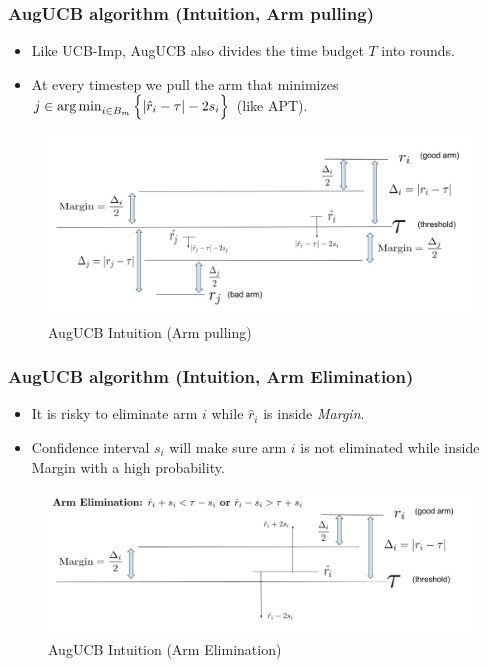 \begin{frame}
\frametitle{AugUCB algorithm (Intuition, Arm pulling)}
\begin{itemize}
\item Like UCB-Imp, AugUCB also divides the time budget $T$ into rounds.
\item At every timestep we pull the arm that minimizes $j\in\operatorname*{arg\,min}_{i\in B_{m}}\Big\lbrace |\hat{r}_{i} - \tau | - 2s_{i}\Big\rbrace$ (like APT). 
\end{itemize}

\begin{figure}
\caption{AugUCB Intuition (Arm pulling)}
\includegraphics[scale=0.178]{img/SeminarThresholdBandit.png}
\end{figure}
\end{frame}

\begin{frame}
\frametitle{AugUCB algorithm (Intuition, Arm Elimination)}
\begin{itemize}
\item It is risky to eliminate arm $i$ while $\hat{r}_i$ is inside \emph{Margin}. 
\item Confidence interval $s_i$ will make sure arm $i$ is not eliminated while inside Margin with a high probability. 
\end{itemize}

\begin{figure}
\caption{AugUCB Intuition (Arm Elimination)}
\includegraphics[scale=0.278]{img/ArmElim1.png}
\end{figure}
\end{frame}

